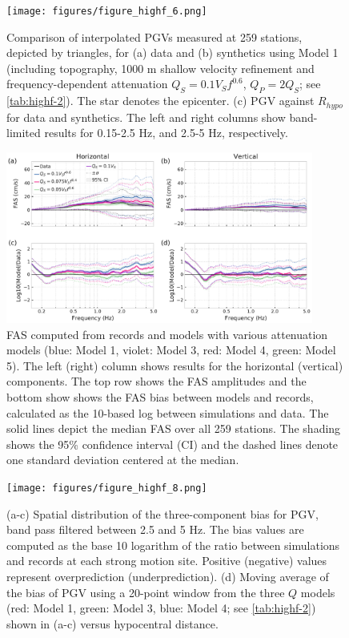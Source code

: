 \begin{figure}[!ht]
  \centering
  \texttt{[image: figures/figure\_highf\_6.png]}
  \caption{Comparison of interpolated PGVs measured at 259 stations, depicted by triangles, for (a) data and (b) synthetics using Model 1 (including topography, 1000 m shallow velocity refinement and frequency-dependent attenuation $Q_S=0.1V_Sf^{0.6}$, $Q_P=2Q_S$; see \cref{tab:highf-2}). The star denotes the epicenter. (c) PGV against $R_{hypo}$ for data and synthetics. The left and right columns show band-limited results for 0.15-2.5 Hz, and 2.5-5 Hz, respectively.
  }
  \label{fig:highf-6}
\end{figure}
\clearpage

\begin{figure}[!ht]
  \centering
  \includegraphics[width=0.9\textwidth,height=0.9\textheight,keepaspectratio]{figures/figure_highf_7.pdf}
  \caption{FAS computed from records and models with various attenuation models (blue: Model 1, violet: Model 3, red: Model 4, green: Model 5). The left (right) column shows results for the horizontal (vertical) components. The top row shows the FAS amplitudes and the bottom show shows the FAS bias between models and records, calculated as the 10-based log between simulations and data. The solid lines depict the median FAS over all 259 stations. The shading shows the 95\% confidence interval (CI) and the dashed lines denote one standard deviation centered at the median.
  }
  \label{fig:highf-7}
\end{figure}
\clearpage

\begin{figure}[!ht]
  \centering
  \texttt{[image: figures/figure\_highf\_8.png]}
  \caption{(a-c) Spatial distribution of the three-component bias for PGV, band pass filtered between 2.5 and 5 Hz. The bias values are computed as the base 10 logarithm of the ratio between simulations and records at each strong motion site. Positive (negative) values represent overprediction (underprediction). (d) Moving average of the bias of PGV using a 20-point window from the three $Q$ models (red: Model 1, green: Model 3, blue: Model 4; see \cref{tab:highf-2}) shown in (a-c) versus hypocentral distance.
  }
  \label{fig:highf-8}
\end{figure}
\clearpage

